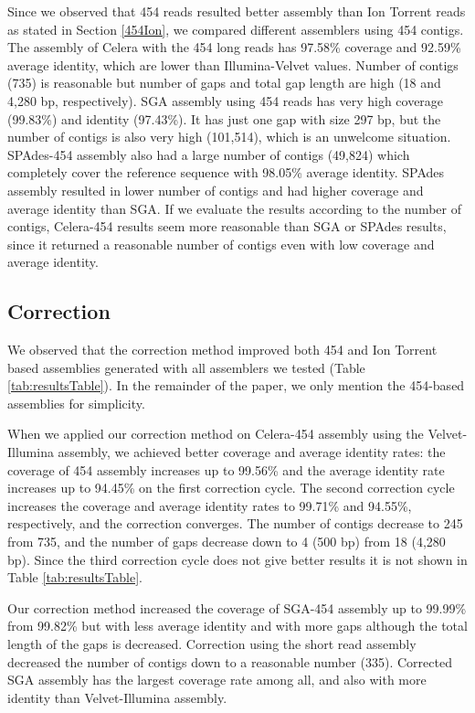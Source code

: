 \documentclass{llncs}
\begin{document}
Since we observed that 454 reads resulted better assembly than Ion Torrent reads as stated in Section \ref{454Ion}, we compared different assemblers using 454 contigs. The assembly of Celera with the 454 long reads has 97.58\% coverage and 92.59\% average identity, which are lower than Illumina-Velvet values. Number of contigs (735) is reasonable but number of gaps and total gap length are high (18 and 4,280 bp, respectively). 
SGA assembly using 454 reads has very high coverage (99.83\%) and identity (97.43\%). It has just one gap with size 297 bp, but the number of contigs is also very high (101,514), which is an unwelcome situation. SPAdes-454 assembly also had a large number of contigs (49,824) which completely cover the reference sequence with 98.05\% average identity. SPAdes assembly resulted in lower number of contigs and had higher coverage and average identity than SGA. 
If we evaluate the results according to the number of contigs, Celera-454 results seem more reasonable than SGA or SPAdes results, since it returned a reasonable number of contigs even with low coverage and average identity.

\subsection{Correction}
\label{res_corr}
We observed that the correction method improved both 454 and Ion Torrent based assemblies generated with all assemblers we tested (Table \ref{tab:resultsTable}). In the remainder of the paper, we only mention the 454-based assemblies for simplicity.

When we applied our correction method on Celera-454 assembly using the Velvet-Illumina assembly, we achieved better coverage and average identity rates: the coverage of 454 assembly increases up to 99.56\% and the average identity rate increases up to 94.45\% on the first correction cycle. The second correction cycle increases the coverage and average identity rates to 99.71\% and 94.55\%, respectively, and the correction converges. The number of contigs decrease to 245 from 735, and the number of gaps decrease down to 4 (500 bp) from 18 (4,280 bp). Since the third correction cycle does not give better results it is not shown in Table \ref{tab:resultsTable}.

Our correction method increased the coverage of SGA-454 assembly up to 99.99\% from 99.82\% but with less average identity and with more gaps although the total length of the gaps is decreased. Correction using the short read assembly decreased the number of contigs down to a reasonable number (335). Corrected SGA assembly has the largest coverage rate among all, and also with more identity than Velvet-Illumina assembly.
\end{document}
